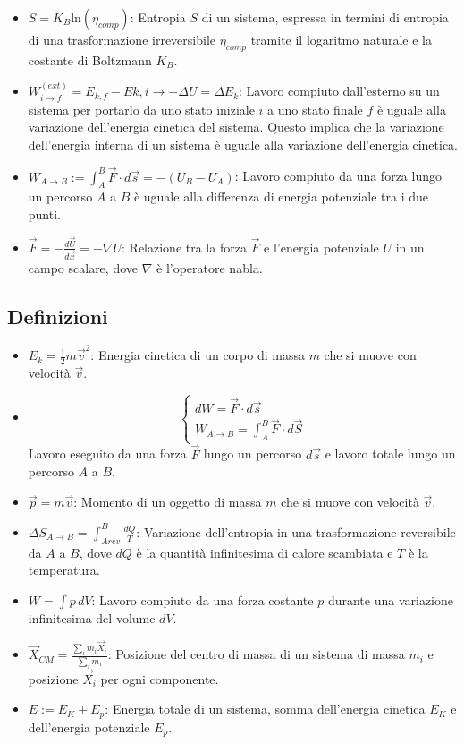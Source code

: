 \documentclass{article}
\begin{document}
\begin{itemize}
    \item \(S = K_B \text{ln}(\eta_{comp})\): Entropia \(S\) di un sistema, espressa in termini di entropia di una trasformazione irreversibile \(\eta_{comp}\) tramite il logaritmo naturale e la costante di Boltzmann \(K_B\).
    \item \( W_{i \to f}^{(ext)} = E_{k,f} - E{k,i} \rightarrow -\Delta U = \Delta E_k\): Lavoro compiuto dall'esterno su un sistema per portarlo da uno stato iniziale \(i\) a uno stato finale \(f\) è uguale alla variazione dell'energia cinetica del sistema. Questo implica che la variazione dell'energia interna di un sistema è uguale alla variazione dell'energia cinetica.
    \item \( W_{A \to B} := \int_{A}^{B} \Vec{F} \cdot d \Vec{s} = -(U_B - U_A)\): Lavoro compiuto da una forza lungo un percorso \(A\) a \(B\) è uguale alla differenza di energia potenziale tra i due punti.
     \item \( \vec{F} = - \frac{d\vec{U}}{d\vec{x}} = - \nabla U\): Relazione tra la forza \(\vec{F}\) e l'energia potenziale \(U\) in un campo scalare, dove \(\nabla\) è l'operatore nabla.
\end{itemize}
\subsection{Definizioni}
\begin{itemize}
    \item \(E_k = \frac{1}{2}m \Vec{v}^2\): Energia cinetica di un corpo di massa \(m\) che si muove con velocità \(\vec{v}\).
    \item 
    \[
        \begin{cases}
            dW = \Vec{F} \cdot d \Vec{s} \\
            W_{A \rightarrow B}= \int_{A}^{B} \Vec{F} \cdot d \Vec{S}
        \end{cases}
    \]Lavoro eseguito da una forza \(\vec{F}\) lungo un percorso \(d\vec{s}\) e lavoro totale lungo un percorso \(A\) a \(B\).
    \item \(\Vec{p} = m \Vec{v}\): Momento di un oggetto di massa \(m\) che si muove con velocità \(\vec{v}\).
    \item \(\Delta S_{A \rightarrow B} = \int_{A rev}^{B}\frac{dQ}{T}\): Variazione dell'entropia in una trasformazione reversibile da \(A\) a \(B\), dove \(dQ\) è la quantità infinitesima di calore scambiata e \(T\) è la temperatura.
    \item \(W = \int p \, dV\): Lavoro compiuto da una forza costante \(p\) durante una variazione infinitesima del volume \(dV\).
    \item \(\Vec{X}_{CM} = \frac{\sum_{i}m_i\Vec{X}_i}{\sum_{i}m_i}\): Posizione del centro di massa di un sistema di massa \(m_i\) e posizione \(\vec{X}_i\) per ogni componente.
    \item \(E := E_K + E_p\): Energia totale di un sistema, somma dell'energia cinetica \(E_K\) e dell'energia potenziale \(E_p\).
\end{itemize}
\end{document}
